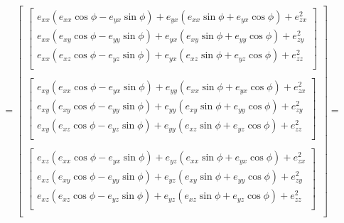 \[
    =
    \begin{bmatrix}
        \begin{bmatrix}
            e_{xx} (e_{xx} \cos \phi - e_{yx} \sin \phi) + e_{yx} (e_{xx} \sin \phi + e_{yx} \cos \phi) + e_{zx}^2 \\
            e_{xx} (e_{xy} \cos \phi - e_{yy} \sin \phi) + e_{yx} (e_{xy} \sin \phi + e_{yy} \cos \phi) + e_{zy}^2 \\
            e_{xx} (e_{xz} \cos \phi - e_{yz} \sin \phi) + e_{yx} (e_{xz} \sin \phi + e_{yz} \cos \phi) + e_{zz}^2 \\
        \end{bmatrix} \\ \\
        \begin{bmatrix}
            e_{xy} (e_{xx} \cos \phi - e_{yx} \sin \phi) + e_{yy} (e_{xx} \sin \phi + e_{yx} \cos \phi) + e_{zx}^2 \\
            e_{xy} (e_{xy} \cos \phi - e_{yy} \sin \phi) + e_{yy} (e_{xy} \sin \phi + e_{yy} \cos \phi) + e_{zy}^2 \\
            e_{xy} (e_{xz} \cos \phi - e_{yz} \sin \phi) + e_{yy} (e_{xz} \sin \phi + e_{yz} \cos \phi) + e_{zz}^2 \\
        \end{bmatrix} \\ \\
        \begin{bmatrix}
            e_{xz} (e_{xx} \cos \phi - e_{yx} \sin \phi) + e_{yz} (e_{xx} \sin \phi + e_{yx} \cos \phi) + e_{zx}^2 \\
            e_{xz} (e_{xy} \cos \phi - e_{yy} \sin \phi) + e_{yz} (e_{xy} \sin \phi + e_{yy} \cos \phi) + e_{zy}^2 \\
            e_{xz} (e_{xz} \cos \phi - e_{yz} \sin \phi) + e_{yz} (e_{xz} \sin \phi + e_{yz} \cos \phi) + e_{zz}^2 \\
        \end{bmatrix} \\
    \end{bmatrix} =
\]
